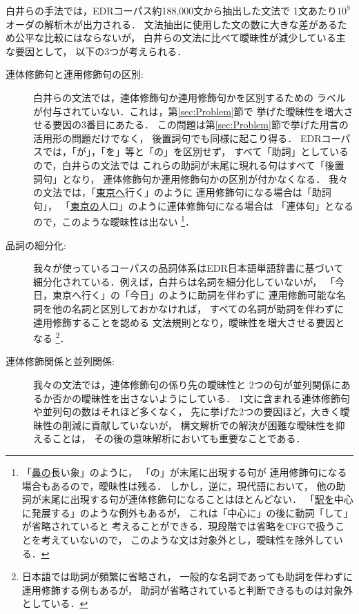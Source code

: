 白井らの手法では，EDRコーパス約188,000文から抽出した文法で
1文あたり$10^9$オーダの解析木が出力される\cite{shirai:97}．
文法抽出に使用した文の数に大きな差があるため公平な比較にはならないが，
白井らの文法に比べて曖昧性が減少している主な要因として，
以下の3つが考えられる．
\begin{description}
\item[連体修飾句と連用修飾句の区別: ]
  白井らの文法では，連体修飾句か連用修飾句かを区別するための
  ラベルが付与されていない．これは，第\ref{sec:Problem}節で
  挙げた曖昧性を増大させる要因の3番目にあたる．
  この問題は第\ref{sec:Problem}節で挙げた用言の活用形の問題だけでなく，
  後置詞句でも同様に起こり得る．
  EDRコーパスでは，「が」，「を」等と「の」を区別せず，
  すべて「助詞」としているので，白井らの文法では
  これらの助詞が末尾に現れる句はすべて「後置詞句」となり，
  連体修飾句か連用修飾句かの区別が付かなくなる．
  我々の文法では，「\underline{東京へ}行く」のように
  連用修飾句になる場合は「助詞句」，
  「\underline{東京の}人口」のように連体修飾句になる場合は
  「連体句」となるので，このような曖昧性は出ない
  \footnote{「\underline{鼻の}長い象」のように，
    「の」が末尾に出現する句が
    連用修飾句になる場合もあるので，曖昧性は残る．
    しかし，逆に，現代語において，
    他の助詞が末尾に出現する句が連体修飾句になることはほとんどない．
    「\underline{駅を}中心に発展する」のような例外もあるが，
    これは「中心に」の後に動詞「して」が省略されていると
    考えることができる．現段階では省略をCFGで扱うことを考えていないので，
    このような文は対象外とし，曖昧性を除外している．}．
\item[品詞の細分化: ]
  我々が使っているコーパスの品詞体系はEDR日本語単語辞書に基づいて
  細分化されている．例えば，白井らは名詞を細分化していないが，
  「今日，東京へ行く」の「今日」のように助詞を伴わずに
  連用修飾可能な名詞を他の名詞と区別しておかなければ，
  すべての名詞が助詞を伴わずに連用修飾することを認める
  文法規則となり，曖昧性を増大させる要因となる
  \footnote{日本語では助詞が頻繁に省略され，
    一般的な名詞であっても助詞を伴わずに連用修飾する例もあるが，
    助詞が省略されていると判断できるものは対象外としている．}．
\item[連体修飾関係と並列関係: ] 
  我々の文法では，連体修飾句の係り先の曖昧性と
  2つの句が並列関係にあるか否かの曖昧性を出さないようにしている．
  1文に含まれる連体修飾句や並列句の数はそれほど多くなく，
  先に挙げた2つの要因ほど，大きく曖昧性の削減に貢献していないが，
  構文解析での解決が困難な曖昧性を抑えることは，
  その後の意味解析においても重要なことである．
\end{description}

